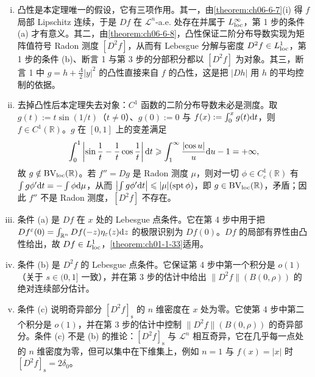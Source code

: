 \documentclass[../../main.tex]{subfiles}%
\begin{document}
\begin{remark}\label{remark:ch06-thm-6-9-条件}
\begin{enumerate}[(i)]
\item 凸性是本定理唯一的假设，它有三项作用。其一，由\cref{theorem:ch06-6-7}(i) 得 $f$ 局部 Lipschitz 连续，于是 $Df$ 在 $\mathcal{L}^{n}$-a.e. 处存在并属于 $L^{\infty}_{\mathrm{loc}}$，第 1 步的条件 (a) 才有意义。其二，由\cref{theorem:ch06-6-8}，凸性保证二阶分布导数实现为矩阵值符号 Radon 测度 $[D^{2}f]$，从而有 Lebesgue 分解与密度 $D^{2}f\in L^{1}_{\mathrm{loc}}$，第 1 步的条件 (b)、断言 1 与第 3 步的分部积分都以 $[D^{2}f]$ 为对象。其三，断言 1 中 $g=h+\frac{\Lambda}{2}\lvert y\rvert^{2}$ 的凸性直接来自 $f$ 的凸性，这是把 $\lvert Dh\rvert$ 用 $h$ 的平均控制的依据。%
\item 去掉凸性后本定理失去对象：$C^{1}$ 函数的二阶分布导数未必是测度。取 $g(t):=t\sin(1/t)$（$t\neq0$）、$g(0):=0$ 与 $f(x):=\int_{0}^{x}g(t)\mathrm{d} t$，则 $f\in C^{1}(\mathbb{R})$。$g$ 在 $[0,1]$ 上的变差满足
\begin{align*}
\int_{0}^{1}\left|\sin\frac{1}{t}-\frac{1}{t}\cos\frac{1}{t}\right|\mathrm{d} t\geqslant\int_{1}^{\infty}\frac{\lvert\cos u\rvert}{u}\mathrm{d} u-1=+\infty,
\end{align*}
故 $g\notin\mathrm{BV}_{\mathrm{loc}}(\mathbb{R})$。若 $f''=Dg$ 是 Radon 测度 $\mu$，则对一切 $\phi\in C_{c}^{1}(\mathbb{R})$ 有 $\int g\phi'\mathrm{d} t=-\int\phi\mathrm{d}\mu$，从而 $\left|\int g\phi'\mathrm{d} t\right|\leqslant\lvert\mu\rvert(\operatorname{spt}\phi)$，即 $g\in\mathrm{BV}_{\mathrm{loc}}(\mathbb{R})$，矛盾；因此 $f''$ 不是 Radon 测度，$[D^{2}f]$ 不存在。%
\item 条件 (a) 是 $Df$ 在 $x$ 处的 Lebesgue 点条件。它在第 4 步中用于把 $Df^{\varepsilon}(0)=\int_{\mathbb{R}^{n}}Df(-z)\eta_{\varepsilon}(z)\mathrm{d} z$ 的极限识别为 $Df(0)$。$Df$ 的局部有界性由凸性给出，故 $Df\in L^{1}_{\mathrm{loc}}$，\cref{theorem:ch01-1-33}适用。%
\item 条件 (b) 是 $D^{2}f$ 的 Lebesgue 点条件。它保证第 4 步中第一个积分是 $o(1)$（关于 $s\in(0,1]$ 一致），并在第 3 步的估计中给出 $\lVert D^{2}f\rVert(B(0,\rho))$ 的绝对连续部分估计。
\item 条件 (c) 说明奇异部分 $[D^{2}f]_{\mathrm{s}}$ 的 $n$ 维密度在 $x$ 处为零。它使第 4 步中第二个积分是 $o(1)$，并在第 3 步的估计中控制 $\lVert D^{2}f\rVert(B(0,\rho))$ 的奇异部分。条件 (c) 不是 (b) 的推论：$[D^{2}f]_{\mathrm{s}}$ 与 $\mathcal{L}^{n}$ 相互奇异，它在几乎每一点处的 $n$ 维密度为零，但可以集中在下维集上，例如 $n=1$ 与 $f(x)=\lvert x\rvert$ 时 $[D^{2}f]_{\mathrm{s}}=2\delta_{0}$。

\end{enumerate}
\end{remark}
\end{document}
